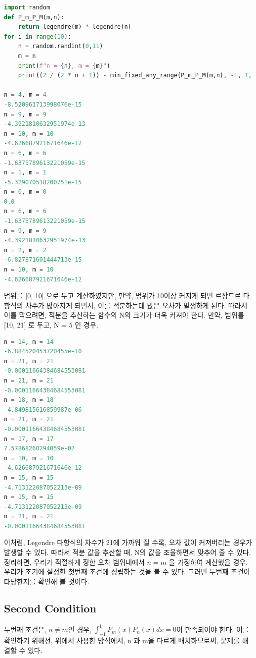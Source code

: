 \documentclass[11pt]{article}
\begin{document}
\begin{lstlisting}[language=Python]
import random
def P_m_P_M(m,n):
    return legendre(m) * legendre(n)
for i in range(10):
    n = random.randint(0,11)
    m = n
    print(f"n = {n}, m = {m}")
    print((2 / (2 * n + 1)) - min_fixed_any_range(P_m_P_M(m,n), -1, 1, 30))
    
n = 4, m = 4
-8.520961713998076e-15
n = 9, m = 9
-4.3921810632951974e-13
n = 10, m = 10
-4.626687921671646e-12
n = 6, m = 6
-1.6375789613221059e-15
n = 1, m = 1
-5.329070518200751e-15
n = 0, m = 0
0.0
n = 6, m = 6
-1.6375789613221059e-15
n = 9, m = 9
-4.3921810632951974e-13
n = 2, m = 2
-6.827871601444713e-15
n = 10, m = 10
-4.626687921671646e-12
        \end{lstlisting}
범위를 [0, 10] 으로 두고 계산하였지만, 만약, 범위가 10이상 커지게 되면 르장드르 다항식의 차수가 많아지게 되면서, 이를 적분하는데 많은 오차가 발생하게 된다. 따라서 이를 막으려면, 적분을 추산하는 함수의 N의 크기가 더욱 커져야 한다. 만약, 범위를 [10, 21] 로 두고, N = 5 인 경우,

\begin{lstlisting}[language=Python]
n = 14, m = 14
-6.884520453720455e-10
n = 21, m = 21
-0.00011664384684553081
n = 21, m = 21
-0.00011664384684553081
n = 18, m = 18
-4.849815616859987e-06
n = 21, m = 21
-0.00011664384684553081
n = 17, m = 17
7.57868260294059e-07
n = 10, m = 10
-4.626687921671646e-12
n = 15, m = 15
-4.713122087052213e-09
n = 15, m = 15
-4.713122087052213e-09
n = 21, m = 21
-0.00011664384684553081
\end{lstlisting}

이처럼, Legendre 다항식의 차수가 21에 가까워 질 수록, 오차 값이 커져버리는 경우가 발생할 수 있다. 따라서 적분 값을 추산할 때, N의 값을 조율하면서 맞추어 줄 수 있다. 정리하면, 우리가 적절하게 정한 오차 범위내에서 $n = m$ 을 가정하여 계산했을 경우, 우리가 초기에 설정한 첫번째 조건에 성립하는 것을 볼 수 있다. 그러면 두번째 조건이 타당한지를 확인해 볼 것이다.



\subsection{Second Condition}
두번째 조건은, $n \neq m$인 경우, $\int_{-1}^1 P_m(x) P_n(x) dx = 0 $이 만족되어야 한다. 이를 확인하기 위해선, 위에서 사용한 방식에서, n 과 m을 다르게 배치하므로써, 문제를 해결할 수 있다.
\end{document}
